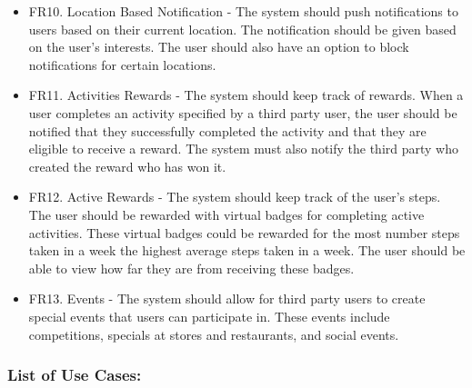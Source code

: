 \documentclass[11pt]{article}
\begin{document}
\begin{itemize}
		\item FR10. Location Based Notification - The system should push notifications to users based on their current location. The notification should be given based on the user's interests. The user should also have an option to block notifications for certain locations. 
		
		\item FR11. Activities Rewards - The system should keep track of rewards. When a user completes an activity specified by a third party user, the user should be notified that they successfully completed the activity and that they are eligible to receive a reward. The system must also notify the third party who created the reward who has won it.
		
		\item FR12. Active Rewards - The system should keep track of the user's steps. The user should be rewarded with virtual badges for completing active activities. These virtual badges could be rewarded for the most number steps taken in a week the highest average steps taken in a week. The user should be able to view how far they are from receiving these badges.
		
		\item FR13. Events - The system should allow for third party users to create special events that users can participate in. These events include competitions, specials at stores and restaurants, and social events. 
	\end{itemize}
	
	\subsubsection{List of Use Cases:}
	
\end{document}
